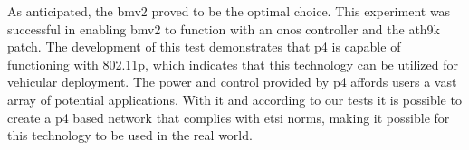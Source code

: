 As anticipated, the \gls{bmv2} proved to be the optimal choice. This experiment was successful in enabling \gls{bmv2} to function with an \gls{onos} controller and the ath9k patch. The development of this test demonstrates that \gls{p4} is capable of functioning with 802.11p, which indicates that this technology can be utilized for vehicular deployment. The power and control provided by \gls{p4} affords users a vast array of potential applications. With it and according to our tests it is possible to create a \gls{p4} based network that complies with \gls{etsi} norms, making it possible for this technology to be used in the real world.

